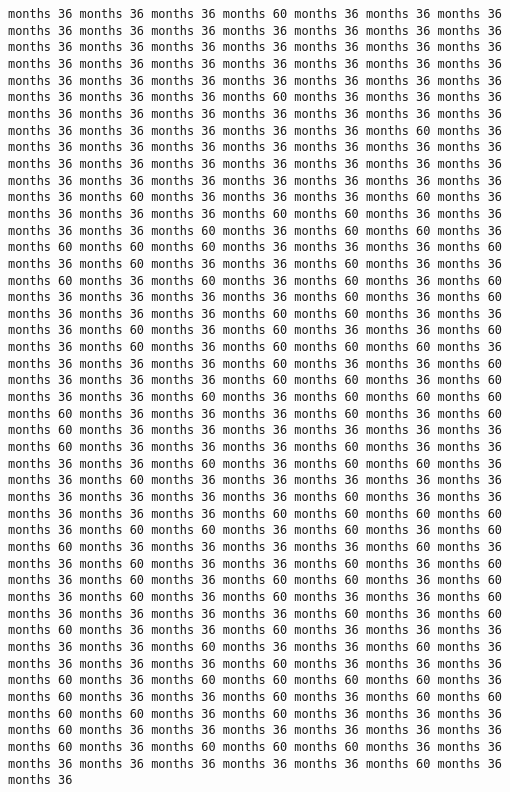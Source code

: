 \documentclass[11pt]{article}
\begin{document}
\begin{Verbatim}[commandchars=\\\{\}, frame=single, framerule=2mm, rulecolor=\color{outerrorbackground}]
months 36 months 36 months 36 months 60 months 36 months 36 months 36 months 36 months 36 months 36 months 36 months 36 months 36 months 36 months 36 months 36 months 36 months 36 months 36 months 36 months 36 months 36 months 36 months 36 months 36 months 36 months 36 months 36 months 36 months 36 months 36 months 36 months 36 months 36 months 36 months 36 months 36 months 36 months 60 months 36 months 36 months 36 months 36 months 36 months 36 months 36 months 36 months 36 months 36 months 36 months 36 months 36 months 36 months 36 months 60 months 36 months 36 months 36 months 36 months 36 months 36 months 36 months 36 months 36 months 36 months 36 months 36 months 36 months 36 months 36 months 36 months 36 months 36 months 36 months 36 months 36 months 36 months 36 months 60 months 36 months 36 months 36 months 60 months 36 months 36 months 36 months 36 months 60 months 60 months 36 months 36 months 36 months 36 months 60 months 36 months 60 months 60 months 36 months 60 months 60 months 60 months 36 months 36 months 36 months 60 months 36 months 60 months 36 months 36 months 60 months 36 months 36 months 60 months 36 months 60 months 36 months 60 months 36 months 60 months 36 months 36 months 36 months 36 months 60 months 36 months 60 months 36 months 36 months 36 months 60 months 60 months 36 months 36 months 36 months 60 months 36 months 60 months 36 months 36 months 60 months 36 months 60 months 36 months 60 months 60 months 60 months 36 months 36 months 36 months 36 months 60 months 36 months 36 months 60 months 36 months 36 months 36 months 60 months 60 months 36 months 60 months 36 months 36 months 60 months 36 months 60 months 60 months 60 months 60 months 36 months 36 months 36 months 60 months 36 months 60 months 60 months 36 months 36 months 36 months 36 months 36 months 36 months 60 months 36 months 36 months 36 months 60 months 36 months 36 months 36 months 36 months 60 months 36 months 60 months 60 months 36 months 36 months 60 months 36 months 36 months 36 months 36 months 36 months 36 months 36 months 36 months 36 months 60 months 36 months 36 months 36 months 36 months 36 months 60 months 60 months 60 months 60 months 36 months 60 months 60 months 36 months 60 months 36 months 60 months 60 months 36 months 36 months 36 months 36 months 60 months 36 months 36 months 60 months 36 months 36 months 60 months 36 months 60 months 36 months 60 months 36 months 60 months 60 months 36 months 60 months 36 months 60 months 36 months 60 months 36 months 36 months 60 months 36 months 36 months 36 months 36 months 60 months 36 months 60 months 60 months 36 months 36 months 60 months 36 months 36 months 36 months 36 months 36 months 60 months 36 months 36 months 60 months 36 months 36 months 36 months 36 months 60 months 36 months 36 months 36 months 60 months 36 months 60 months 60 months 60 months 60 months 36 months 60 months 36 months 36 months 60 months 36 months 60 months 60 months 60 months 60 months 36 months 60 months 36 months 36 months 36 months 60 months 36 months 36 months 36 months 36 months 36 months 36 months 60 months 36 months 60 months 60 months 60 months 36 months 36 months 36 months 36 months 36 months 36 months 36 months 60 months 36 months 36 
\end{Verbatim}
\end{document}
